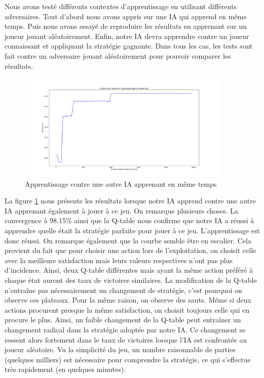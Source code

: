 Nous avons testé différents contextes d'apprentissage en utilisant différents adversaires. Tout d'abord nous avons appris sur une IA qui apprend en même temps. Puis 
nous avons essayé de reproduire les résultats en apprenant sur un joueur jouant aléatoirement. Enfin, notre IA devra apprendre contre un joueur connaissant et 
appliquant la stratégie gagnante. Dans tous les cas, les tests sont fait contre un adversaire jouant aléatoirement pour pouvoir comparer les résultats.

\begin{figure}[h]
 \centering
 \includegraphics[width = 0.9\textwidth]{img/learnWithAI_testRandom.png}
 \caption{Apprentissage contre une autre IA apprenant en même temps}
 \label{fig:learnWithAI}
\end{figure}

La figure \ref{fig:learnWithAI} nous présente les résultats lorsque notre IA apprend contre une autre IA apprenant également à jouer à ce jeu. On remarque plusieurs choses.
La convergence à 98.15\% ainsi que la Q-table nous confirme que notre IA a réussi à apprendre quelle était la stratégie parfaite pour jouer à ce jeu. L'apprentissage 
est donc réussi. On remarque également que la courbe semble être en escalier. Cela provient du fait que pour choisir une action lors de l'exploitation, on choisit celle
avec la meilleure satisfaction mais leurs valeurs respectives n'ont pas plus d'incidence. Ainsi, deux Q-table différentes mais ayant la même action préféré à chaque état
auront des taux de victoires similaires. La modification de la Q-table n'entraîne pas nécessairement un changement de stratégie, c'est pourquoi on observe ces plateaux.
Pour la même raison, on observe des sauts. Même si deux actions procurent presque la même satisfaction, on choisit toujours celle qui en procure le plus. Ainsi, un faible
changement de la Q-table peut entraîner un changement radical dans la stratégie adoptée par notre IA. Ce changement se ressent alors fortement dans le taux de victoires
lorsque l'IA est confrontée au joueur aléatoire. Vu la simplicité du jeu, un nombre raisonnable de parties (quelques milliers) est nécessaire pour comprendre la stratégie,
ce qui s'effectue très rapidement (en quelques minutes).

